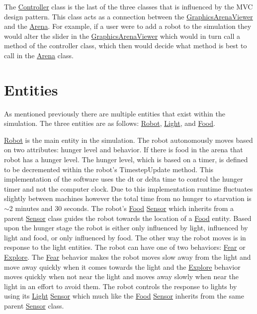 The \mbox{\hyperlink{class_controller}{Controller}} class is the last of the three classes that is influenced by the M\+VC design pattern. This class acts as a connection between the \mbox{\hyperlink{class_graphics_arena_viewer}{Graphics\+Arena\+Viewer}} and the \mbox{\hyperlink{class_arena}{Arena}}. For example, if a user were to add a robot to the simulation they would alter the slider in the \mbox{\hyperlink{class_graphics_arena_viewer}{Graphics\+Arena\+Viewer}} which would in turn call a method of the controller class, which then would decide what method is best to call in the \mbox{\hyperlink{class_arena}{Arena}} class.\hypertarget{index_entities_sec}{}\section{Entities}\label{index_entities_sec}
As mentioned previously there are multiple entities that exist within the simulation. The three entities are as follows\+: \mbox{\hyperlink{class_robot}{Robot}}, \mbox{\hyperlink{class_light}{Light}}, and \mbox{\hyperlink{class_food}{Food}}.

\mbox{\hyperlink{class_robot}{Robot}} is the main entity in the simulation. The robot autonomously moves based on two attributes\+: hunger level and behavior. If there is food in the arena that robot has a hunger level. The hunger level, which is based on a timer, is defined to be decremented within the robot’s Timestep\+Update method. This implementation of the software uses the dt or delta time to control the hunger timer and not the computer clock. Due to this implementation runtime fluctuates slightly between machines however the total time from no hunger to starvation is $\sim$2 minutes and 30 seconds. The robot’s \mbox{\hyperlink{class_food}{Food}} \mbox{\hyperlink{class_sensor}{Sensor}} which inherits from a parent \mbox{\hyperlink{class_sensor}{Sensor}} class guides the robot towards the location of a \mbox{\hyperlink{class_food}{Food}} entity. Based upon the hunger stage the robot is either only influenced by light, influenced by light and food, or only influenced by food. The other way the robot moves is in response to the light entities. The robot can have one of two behaviors\+: \mbox{\hyperlink{class_fear}{Fear}} or \mbox{\hyperlink{class_explore}{Explore}}. The \mbox{\hyperlink{class_fear}{Fear}} behavior makes the robot moves slow away from the light and move away quickly when it comes towards the light and the \mbox{\hyperlink{class_explore}{Explore}} behavior moves quickly when not near the light and moves away slowly when near the light in an effort to avoid them. The robot controls the response to lights by using its \mbox{\hyperlink{class_light}{Light}} \mbox{\hyperlink{class_sensor}{Sensor}} which much like the \mbox{\hyperlink{class_food}{Food}} \mbox{\hyperlink{class_sensor}{Sensor}} inherits from the same parent \mbox{\hyperlink{class_sensor}{Sensor}} class.

